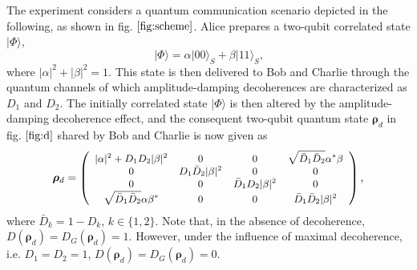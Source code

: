 \documentclass[%
 reprint,
 amsmath,amssymb,
 aps,
]{revtex4-1}
\begin{document}
The experiment considers a quantum communication scenario depicted in the following, as shown in fig. $\ref{fig:scheme}$. Alice prepares a two-qubit correlated state $|\Phi\rangle$,
\begin{equation}
|\Phi\rangle = \alpha |00\rangle_S + \beta|11\rangle_S \text{,}
\end{equation}
\noindent where $|\alpha|^2+|\beta|^2=1$. This state is then delivered to Bob and Charlie through the quantum channels of which amplitude-damping decoherences are characterized as $D_1$ and $D_2$. The initially correlated state $|\Phi\rangle$ is then altered by the amplitude-damping decoherence effect, and the consequent two-qubit quantum state $\boldsymbol{\rho}_d$ in fig. $\ref{fig:d}$ shared by Bob and Charlie is now given as
\begin{align*}
\boldsymbol{\rho}_d =
\begin{small} \left( \begin{array}{cccc}
|\alpha|^2+D_1 D_2 |\beta|^2 & 0 & 0 & \sqrt{\bar{D}_1 \bar{D}_2} \alpha^* \beta \\
0 & D_1 \bar{D}_2 |\beta|^2 & 0 & 0 \\
0 & 0 & \bar{D}_1 D_2 |\beta|^2 & 0 \\
\sqrt{\bar{D}_1 \bar{D}_2} \alpha \beta^* & 0 & 0 & \bar{D}_1 \bar{D}_2 |\beta|^2 \end{array} \right) \end{small} \text{,}
\end{align*}
\noindent where $\bar{D}_k=1-D_k$, $k \in \{1,2\}$. Note that, in the absence of decoherence, $\textit{D}(\boldsymbol{\rho}_d) = \textit{D}_G(\boldsymbol{\rho}_d) = 1$. However, under the influence of maximal decoherence, i.e. $D_1=D_2=1$, $\textit{D}(\boldsymbol{\rho}_d) = \textit{D}_G(\boldsymbol{\rho}_d) = 0$.
\end{document}
